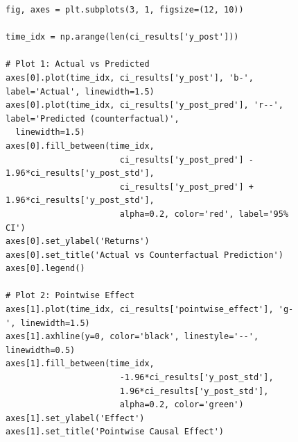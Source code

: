 \begin{figure}[!htbp]
\centering
\begin{verbatim}
fig, axes = plt.subplots(3, 1, figsize=(12, 10))                                                  
                                                                                                    
time_idx = np.arange(len(ci_results['y_post']))                                                   
                                                                                                    
# Plot 1: Actual vs Predicted                                                                     
axes[0].plot(time_idx, ci_results['y_post'], 'b-', label='Actual', linewidth=1.5)                 
axes[0].plot(time_idx, ci_results['y_post_pred'], 'r--', label='Predicted (counterfactual)',      
  linewidth=1.5)                                                                                    
axes[0].fill_between(time_idx,                                                                    
                       ci_results['y_post_pred'] - 1.96*ci_results['y_post_std'],                   
                       ci_results['y_post_pred'] + 1.96*ci_results['y_post_std'],                   
                       alpha=0.2, color='red', label='95% CI')                                      
axes[0].set_ylabel('Returns')                                                                     
axes[0].set_title('Actual vs Counterfactual Prediction')                                          
axes[0].legend()                                                                                  
                                                                                                    
# Plot 2: Pointwise Effect                                                                        
axes[1].plot(time_idx, ci_results['pointwise_effect'], 'g-', linewidth=1.5)                       
axes[1].axhline(y=0, color='black', linestyle='--', linewidth=0.5)                                
axes[1].fill_between(time_idx,                                                                    
                       -1.96*ci_results['y_post_std'],                                              
                       1.96*ci_results['y_post_std'],                                               
                       alpha=0.2, color='green')                                                    
axes[1].set_ylabel('Effect')                                                                      
axes[1].set_title('Pointwise Causal Effect')                                                      
                                                                                                    

\end{verbatim}
\end{figure}

